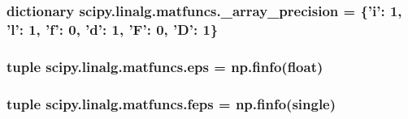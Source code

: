 \subsubsection[{\+\_\+array\+\_\+precision}]{\setlength{\rightskip}{0pt plus 5cm}dictionary scipy.\+linalg.\+matfuncs.\+\_\+array\+\_\+precision = \{'{\bf i}'\+: 1, '{\bf l}'\+: 1, 'f'\+: 0, 'd'\+: 1, 'F'\+: 0, '{\bf D}'\+: 1\}}\label{namespacescipy_1_1linalg_1_1matfuncs_a85725307238d9369de3e23a2a1fae7c1}
\hypertarget{namespacescipy_1_1linalg_1_1matfuncs_aa9abd4f0aca21512eeeeba99a75fe51b}{}
\subsubsection[{eps}]{\setlength{\rightskip}{0pt plus 5cm}tuple scipy.\+linalg.\+matfuncs.\+eps = np.\+finfo(float)}\label{namespacescipy_1_1linalg_1_1matfuncs_aa9abd4f0aca21512eeeeba99a75fe51b}
\hypertarget{namespacescipy_1_1linalg_1_1matfuncs_aedf0e9965e4728255583bf282a694a48}{}
\subsubsection[{feps}]{\setlength{\rightskip}{0pt plus 5cm}tuple scipy.\+linalg.\+matfuncs.\+feps = np.\+finfo(single)}\label{namespacescipy_1_1linalg_1_1matfuncs_aedf0e9965e4728255583bf282a694a48}

